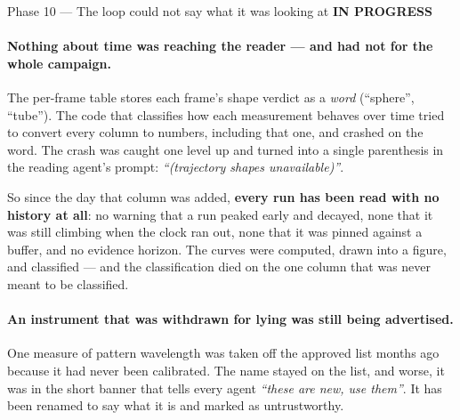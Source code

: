\documentclass[11pt,a4paper]{article}
\newcommand{\prog}{\textcolor{warn}{\textbf{IN PROGRESS}}}
\begin{document}
\begin{phasebox}{Phase 10 --- The loop could not say what it was looking at \hfill \prog}
\paragraph{Nothing about time was reaching the reader --- and had not for the whole campaign.}
The per-frame table stores each frame's shape verdict as a \emph{word} (``sphere'', ``tube'').
The code that classifies how each measurement behaves over time tried to convert every column to
numbers, including that one, and crashed on the word. The crash was caught one level up and
turned into a single parenthesis in the reading agent's prompt: \emph{``(trajectory shapes
unavailable)''}.

So since the day that column was added, \textbf{every run has been read with no history at all}:
no warning that a run peaked early and decayed, none that it was still climbing when the clock
ran out, none that it was pinned against a buffer, and no evidence horizon. The curves were
computed, drawn into a figure, and classified --- and the classification died on the one column
that was never meant to be classified.

\paragraph{An instrument that was withdrawn for lying was still being advertised.} One measure of
pattern wavelength was taken off the approved list months ago because it had never been
calibrated. The name stayed on the list, and worse, it was in the short banner that tells every
agent \emph{``these are new, use them''}. It has been renamed to say what it is and marked as
untrustworthy.


\end{phasebox}
\end{document}

